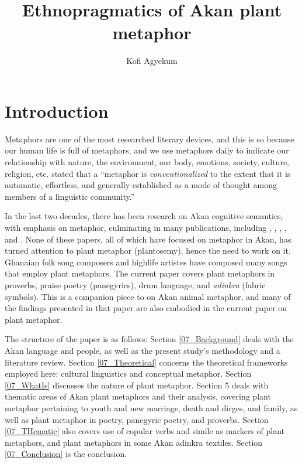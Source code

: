 \documentclass[output=paper,colorlinks,citecolor=brown]{langscibook}
\author{Kofi Agyekum\affiliation{University of Ghana, Legon}}
\title{Ethnopragmatics of Akan plant metaphor}
\begin{document}
\maketitle

\section{Introduction}

Metaphors are one of the most researched literary devices, and this is so because our human life is full of metaphors, and we use metaphors daily to indicate our relationship with nature, the environment, our body, emotions, society, culture, religion, etc. \citet[55]{LakoffandTurner1989} stated that a ``metaphor is \textit{conventionalized} to the extent that it is automatic, effortless, and generally established as a mode of thought among members of a linguistic community.'' 

In the last two decades, there has been research on Akan cognitive semantics, with emphasis on metaphor, culminating in many publications, including \citet{Agyekum2006From, Agyekum2015a, Agyekum2015b, Agyekum2016, Agyekum2018, Agyekum2020}, \citet{Ansah2014}, \citet{Dzokoto2010}, \citet{DzokotoandOkazaki2006}, and \citet{Gyekye1997}. None of these papers, all of which have focused on metaphor in Akan, has turned attention to plant metaphor (plantosemy), hence the need to work on it. Ghanaian folk song composers and highlife artistes have composed many songs that employ plant metaphors. The current paper covers plant metaphors in proverbs, praise poetry (panegyrics), drum language, and \textit{adinkra} (fabric symbols). This is a companion piece to \citet{Agyekum2023} on Akan animal metaphor, and many of the findings presented in that paper are also embodied in the current paper on plant metaphor.

The structure of the paper is as follows: Section \ref{07_Background} deals with the Akan language and people, as well as the present study’s methodology and a literature review. Section \ref{07_Theoretical} concerns the theoretical frameworks employed here: cultural linguistics and conceptual metaphor. Section \ref{07_WhatIs} discusses the nature of plant metaphor. Section 5 deals with thematic areas of Akan plant metaphors and their analysis, covering plant metaphor pertaining to youth and new marriage, death and dirges, and family, as well as plant metaphor in poetry, panegyric poetry, and proverbs. Section \ref{07_THematic} also covers use of copular verbs and simile as markers of plant metaphors, and plant metaphors in some Akan adinkra textiles. Section \ref{07_Conclusion} is the conclusion.
\end{document}
